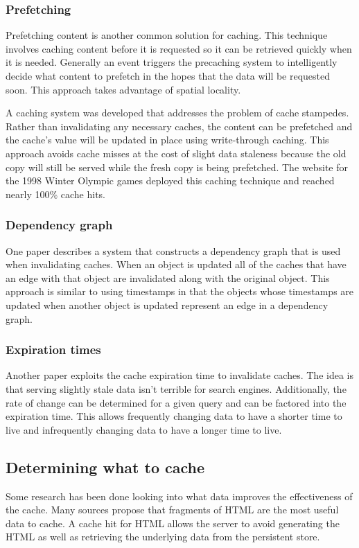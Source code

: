 \documentclass[12pt]{ucthesis}
\begin{document}
\subsubsection{Prefetching}
Prefetching content is another common solution for caching.
This technique involves caching content before it is requested so it can be retrieved quickly when it is needed.
Generally an event triggers the precaching system to intelligently decide what content to prefetch in the hopes that the data will be requested soon.
This approach takes advantage of spatial locality.

A caching system was developed that addresses the problem of cache stampedes.\cite{scalableConsistentCaching}
Rather than invalidating any necessary caches, the content can be prefetched and the cache's value will be updated in place using write-through caching.
This approach avoids cache misses at the cost of slight data staleness because the old copy will still be served while the fresh copy is being prefetched.
The website for the 1998 Winter Olympic games deployed this caching technique and reached nearly 100\% cache hits.\cite{scalableConsistentCaching}

\subsubsection{Dependency graph}
One paper describes a system that constructs a dependency graph that is used when invalidating caches.\cite{scalableConsistentCaching}
When an object is updated all of the caches that have an edge with that object are invalidated along with the original object.
This approach is similar to using timestamps in that the objects whose timestamps are updated when another object is updated represent an edge in a dependency graph.

\subsubsection{Expiration times}
Another paper exploits the cache expiration time to invalidate caches.\cite{refreshingPerspectiveSearch}
The idea is that serving slightly stale data isn't terrible for search engines.
Additionally, the rate of change can be determined for a given query and can be factored into the expiration time.
This allows frequently changing data to have a shorter time to live and infrequently changing data to have a longer time to live.

\subsection{Determining what to cache}
Some research has been done looking into what data improves the effectiveness of the cache.
Many sources propose that fragments of HTML are the most useful data to cache.\cite{comparisonOfCachingSolutions}\cite{scalableConsistentCaching}
A cache hit for HTML allows the server to avoid generating the HTML as well as retrieving the underlying data from the persistent store.\cite{howBasecampGotSoFast}
\end{document}
